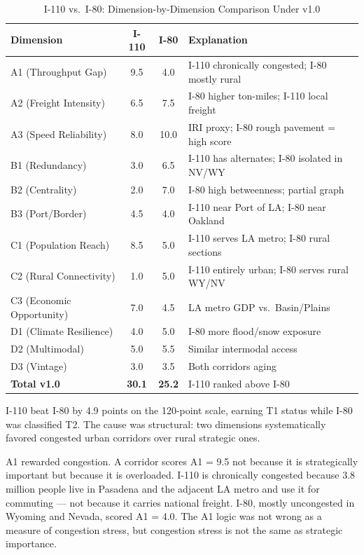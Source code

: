 \begin{table}[h!]
\centering
\caption{I-110 vs.\ I-80: Dimension-by-Dimension Comparison Under v1.0}
\label{tab:v10-paradox}
\begin{tabular}{lccl}
\toprule
\textbf{Dimension} & \textbf{I-110} & \textbf{I-80} & \textbf{Explanation} \\
\midrule
A1 (Throughput Gap)      & 9.5 & 4.0 & I-110 chronically congested; I-80 mostly rural \\
A2 (Freight Intensity)   & 6.5 & 7.5 & I-80 higher ton-miles; I-110 local freight \\
A3 (Speed Reliability)   & 8.0 & 10.0 & IRI proxy; I-80 rough pavement = high score \\
B1 (Redundancy)          & 3.0 & 6.5 & I-110 has alternates; I-80 isolated in NV/WY \\
B2 (Centrality)          & 2.0 & 7.0 & I-80 high betweenness; partial graph \\
B3 (Port/Border)         & 4.5 & 4.0 & I-110 near Port of LA; I-80 near Oakland \\
C1 (Population Reach)    & 8.5 & 5.0 & I-110 serves LA metro; I-80 rural sections \\
C2 (Rural Connectivity)  & 1.0 & 5.0 & I-110 entirely urban; I-80 serves rural WY/NV \\
C3 (Economic Opportunity)& 7.0 & 4.5 & LA metro GDP vs.\ Basin/Plains \\
D1 (Climate Resilience)  & 4.0 & 5.0 & I-80 more flood/snow exposure \\
D2 (Multimodal)          & 5.0 & 5.5 & Similar intermodal access \\
D3 (Vintage)             & 3.0 & 3.5 & Both corridors aging \\
\midrule
\textbf{Total v1.0}      & \textbf{30.1} & \textbf{25.2} & I-110 ranked above I-80 \\
\bottomrule
\end{tabular}
\end{table}

I-110 beat I-80 by 4.9 points on the 120-point scale, earning T1 status while I-80 was classified T2. The cause was structural: two dimensions systematically favored congested urban corridors over rural strategic ones.

A1 rewarded congestion. A corridor scores A1 = 9.5 not because it is strategically important but because it is overloaded. I-110 is chronically congested because 3.8 million people live in Pasadena and the adjacent LA metro and use it for commuting --- not because it carries national freight. I-80, mostly uncongested in Wyoming and Nevada, scored A1 = 4.0. The A1 logic was not wrong as a measure of congestion stress, but congestion stress is not the same as strategic importance.


